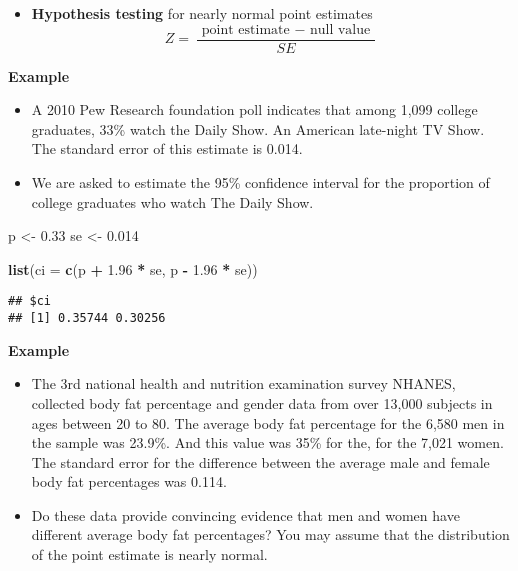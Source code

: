 \documentclass[]{book}
\newenvironment{Shaded}{\begin{snugshade}}{\end{snugshade}}
\newcommand{\DataTypeTok}[1]{\textcolor[rgb]{0.13,0.29,0.53}{#1}}
\newcommand{\FloatTok}[1]{\textcolor[rgb]{0.00,0.00,0.81}{#1}}
\newcommand{\KeywordTok}[1]{\textcolor[rgb]{0.13,0.29,0.53}{\textbf{#1}}}
\newcommand{\NormalTok}[1]{#1}
\newcommand{\OperatorTok}[1]{\textcolor[rgb]{0.81,0.36,0.00}{\textbf{#1}}}
\newcommand{\StringTok}[1]{\textcolor[rgb]{0.31,0.60,0.02}{#1}}
\providecommand{\tightlist}{%
  \setlength{\itemsep}{0pt}\setlength{\parskip}{0pt}}
\begin{document}
\begin{itemize}
\tightlist
\item
  \textbf{Hypothesis testing} for nearly normal point estimates
  \[ Z = \frac{\text{ point estimate } - \text{ null value }}{SE} \]
\end{itemize}

\textbf{Example}

\begin{itemize}
\tightlist
\item
  A 2010 Pew Research foundation poll indicates that among 1,099 college graduates, 33\% watch the Daily Show. An American late-night TV Show. The standard error of this estimate is 0.014.
\item
  We are asked to estimate the 95\% confidence interval for the proportion of college graduates who watch The Daily Show.
\end{itemize}

\begin{Shaded}
\begin{Highlighting}[]
\NormalTok{p <-}\StringTok{ }\FloatTok{0.33}
\NormalTok{se <-}\StringTok{ }\FloatTok{0.014}

\KeywordTok{list}\NormalTok{(}\DataTypeTok{ci =} \KeywordTok{c}\NormalTok{(p }\OperatorTok{+}\StringTok{ }\FloatTok{1.96} \OperatorTok{*}\StringTok{ }\NormalTok{se, p }\OperatorTok{-}\StringTok{ }\FloatTok{1.96} \OperatorTok{*}\StringTok{ }\NormalTok{se))}
\end{Highlighting}
\end{Shaded}

\begin{verbatim}
## $ci
## [1] 0.35744 0.30256
\end{verbatim}

\textbf{Example}

\begin{itemize}
\tightlist
\item
  The 3rd national health and nutrition examination survey NHANES, collected body fat percentage and gender data from over 13,000 subjects in ages between 20 to 80. The average body fat percentage for the 6,580 men in the sample was 23.9\%. And this value was 35\% for the, for the 7,021 women. The standard error for the difference between the average male and female body fat percentages was 0.114.
\item
  Do these data provide convincing evidence that men and women have different average body fat percentages? You may assume that the distribution of the point estimate is nearly normal.
\end{itemize}
\end{document}
